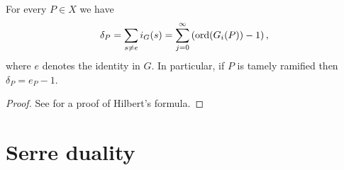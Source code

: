     \begin{thm}\label{hilbertsformula}
    For every $P\in X$ we have
        \begin{equation*}
        \delta_P = \sum_{s\neq e}i_G(s)=\sum_{j=0}^{\infty}\left(\operatorname{ord}(G_i(P))-1\right),\label{ramdiv}
        \end{equation*}
    where $e$ denotes the identity in $G$.
    In particular, if $P$ is tamely ramified then $\delta_P = e_P -1$.
    \end{thm}
    \begin{proof}
    See \cite[Chap. IV, \S 1, Prop. 4]{localfields} for a proof of Hilbert's formula.
    \end{proof}

 
\section{Serre duality}

